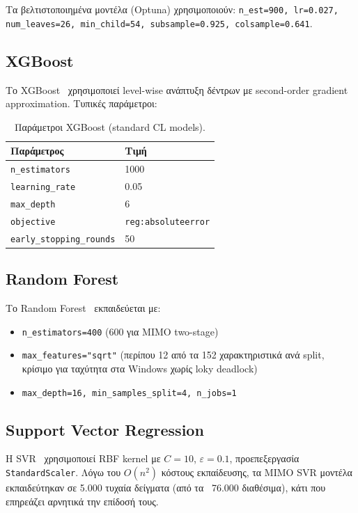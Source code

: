 Τα βελτιστοποιημένα μοντέλα (Optuna) χρησιμοποιούν:
\texttt{n\_est=900, lr=0.027, num\_leaves=26, min\_child=54, subsample=0.925, colsample=0.641}.

\subsection{XGBoost}

Το XGBoost~\cite{chen2016xgboost} χρησιμοποιεί level-wise ανάπτυξη δέντρων με second-order
gradient approximation. Τυπικές παράμετροι:

\begin{table}[H]
\centering
\caption{Παράμετροι XGBoost (standard CL models).}
\label{tab:xgb_params}
\begin{tabular}{ll}
\toprule
\textbf{Παράμετρος} & \textbf{Τιμή} \\
\midrule
\texttt{n\_estimators} & 1000 \\
\texttt{learning\_rate} & 0.05 \\
\texttt{max\_depth} & 6 \\
\texttt{objective} & \texttt{reg:absoluteerror} \\
\texttt{early\_stopping\_rounds} & 50 \\
\bottomrule
\end{tabular}
\end{table}

\subsection{Random Forest}

Το Random Forest~\cite{breiman2001rf} εκπαιδεύεται με:
\begin{itemize}
    \item \texttt{n\_estimators=400} (600 για MIMO two-stage)
    \item \texttt{max\_features="sqrt"} (περίπου 12 από τα 152 χαρακτηριστικά ανά split, κρίσιμο
    για ταχύτητα στα Windows χωρίς loky deadlock)
    \item \texttt{max\_depth=16, min\_samples\_split=4, n\_jobs=1}
\end{itemize}

\subsection{Support Vector Regression}

Η SVR~\cite{smola2004} χρησιμοποιεί RBF kernel με $C=10$, $\varepsilon=0.1$, προεπεξεργασία
\texttt{StandardScaler}. Λόγω του $O(n^2)$ κόστους εκπαίδευσης, τα MIMO SVR μοντέλα εκπαιδεύτηκαν
σε 5.000 τυχαία δείγματα (από τα ~76.000 διαθέσιμα), κάτι που επηρεάζει αρνητικά την επίδοσή τους.

